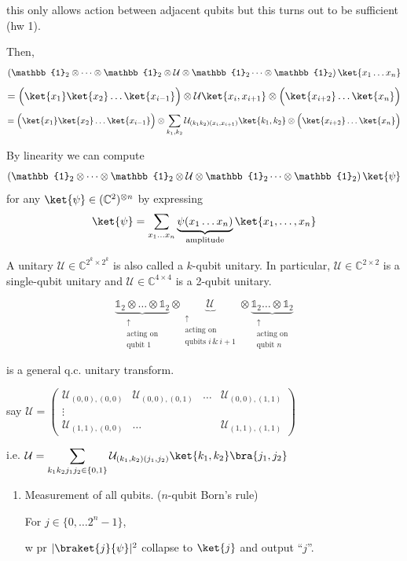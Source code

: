 \documentclass[11pt]{article}
\begin{document}
this only allows action between adjacent qubits but this turns out to be sufficient (hw 1).

Then,
\[
\left(\mathbb{1}_2\otimes\dots\otimes\mathbb{1}_2\otimes\mathcal{U}\otimes\mathbb{1}_2\dots\otimes\mathbb{1}_2\right)\ket{x_1\dots x_n}
\]
\[
= \Big(\ket{x_1}\ket{x_2}\dots\ket{x_{i-1}}\Big) \otimes \mathcal{U}\ket{x_i,x_{i+1}} \otimes \Big(\ket{x_{i+2}}\dots\ket{x_n}\Big)
\]
\[
= \Big(\ket{x_1}\ket{x_2}\dots\ket{x_{i-1}}\Big) \otimes \sum_{k_1,k_2} \mathcal{U}_{(k_1k_2)(x_i,x_{i+1})}\ket{k_1,k_2} \otimes \Big(\ket{x_{i+2}}\dots\ket{x_n}\Big)
\]

By linearity we can compute
\[
\left(\mathbb{1}_2\otimes\dots\otimes\mathbb{1}_2\otimes\mathcal{U}\otimes\mathbb{1}_2\dots\otimes\mathbb{1}_2\right)\ket{\psi}
\]
for any $\ket{\psi}\in(\mathbb{C}^2)^{\otimes n}$ by expressing
\[
\ket{\psi} = \sum_{x_1\dots x_n} \underbrace{\psi(x_1\dots x_n)}_{\text{amplitude}}\ket{x_1,\dots,x_n}
\]

A unitary $\mathcal{U} \in \mathbb{C}^{2^k \times 2^k}$ is also called a $k$-qubit unitary. In particular, $\mathcal{U}\in\mathbb{C}^{2\times2}$ is a single-qubit unitary and $\mathcal{U}\in\mathbb{C}^{4\times4}$ is a 2-qubit unitary.

\[
\underbrace{\mathbb{1}_2\otimes\dots\otimes\mathbb{1}_2}_{\substack{\uparrow\\\text{acting on}\\\text{qubit }1}} \otimes \underbrace{\mathcal{U}}_{\substack{\uparrow\\\text{acting on}\\\text{qubits }i \,\&\, i{+}1}} \otimes \underbrace{\mathbb{1}_2\dots\otimes\mathbb{1}_2}_{\substack{\uparrow\\\text{acting on}\\\text{qubit }n}}
\]

is a general q.c. unitary transform.

say $\mathcal{U} = \begin{pmatrix} \mathcal{U}_{(0,0),(0,0)} & \mathcal{U}_{(0,0),(0,1)} & \dots & \mathcal{U}_{(0,0),(1,1)} \\ \vdots & & & \\ \mathcal{U}_{(1,1),(0,0)} & \dots & & \mathcal{U}_{(1,1),(1,1)} \end{pmatrix}$

i.e. $\displaystyle \mathcal{U} = \sum_{k_1k_2j_1j_2 \in \{0,1\}} \mathcal{U}_{(k_1,k_2)(j_1,j_2)} \ket{k_1,k_2}\bra{j_1,j_2}$

\begin{enumerate}
    \item[\textcircled{3}] Measurement of all qubits. ($n$-qubit Born's rule)

    For $j \in \{0,\dots 2^n-1\}$,

    w pr $|\braket{j}{\psi}|^2$ collapse to $\ket{j}$ and output ``$j$''.
\end{enumerate}
\end{document}
